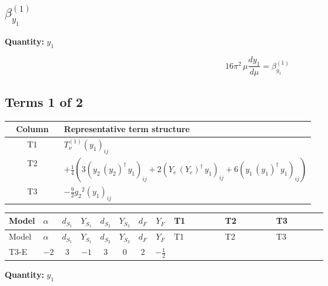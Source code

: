 \documentclass[8pt]{article}
\begin{document}
\begin{landscape}
\section*{$\beta_{y_1}^{(1)}$}
\noindent\textbf{Quantity: }$y_1$\par\smallskip
\[16\pi^2\,\mu\frac{d y_1}{d\mu}=\beta_{y_1}^{(1)}\]
\subsection*{Terms 1 of 2}
\begin{center}
\begin{tabular}{@{}c >{\raggedright\arraybackslash}p{0.82\linewidth}@{}}
\toprule
Column & Representative term structure \\
\midrule
T1 & \(\displaystyle T_{\nu}^{(1)} \left({y_1}\right)_{ij}\) \\
\midrule
T2 & \(\displaystyle +\frac{1}{4} (3 \left({y_2}\,\left({y_2}\right)^{\dagger}\,{y_1}\right)_{ij}+2 \left({Y_e}\,\left({Y_e}\right)^{\dagger}\,{y_1}\right)_{ij}+6 \left({y_1}\,\left({y_1}\right)^{\dagger}\,{y_1}\right)_{ij})\) \\
\midrule
T3 & \(\displaystyle -\frac{9}{2} {g_2}^2 \left({y_1}\right)_{ij}\) \\
\midrule
\bottomrule
\end{tabular}
\end{center}
\smallskip
\tiny
\begin{longtable}{@{}llcccccc >{\raggedright\arraybackslash}p{0.21\linewidth} >{\raggedright\arraybackslash}p{0.21\linewidth} >{\raggedright\arraybackslash}p{0.21\linewidth}@{}}
\toprule
Model & $\alpha$ & $d_{S_1}$ & $Y_{S_1}$ & $d_{S_2}$ & $Y_{S_2}$ & $d_F$ & $Y_F$ & T1 & T2 & T3 \\
\midrule
\endfirsthead
\toprule
Model & $\alpha$ & $d_{S_1}$ & $Y_{S_1}$ & $d_{S_2}$ & $Y_{S_2}$ & $d_F$ & $Y_F$ & T1 & T2 & T3 \\
\midrule
\endhead
T3-E & $-2$ & $3$ & $-1$ & $3$ & $0$ & $2$ & $-\frac{1}{2}$ & \scriptsize\adjustbox{max width=\linewidth}{$\begin{gathered} T_{\nu}^{(1)} \left({y_1}\right)_{ij}\end{gathered}$} & \scriptsize\adjustbox{max width=\linewidth}{$\begin{gathered} +\frac{1}{4} (3 \left({y_2}\,\left({y_2}\right)^{\dagger}\,{y_1}\right)_{ij}+2 \left({Y_e}\,\left({Y_e}\right)^{\dagger}\,{y_1}\right)_{ij}+6 \left({y_1}\,\left({y_1}\right)^{\dagger}\,{y_1}\right)_{ij})\end{gathered}$} & \scriptsize\adjustbox{max width=\linewidth}{$\begin{gathered} -\frac{9}{2} {g_2}^2 \left({y_1}\right)_{ij}\end{gathered}$} \\
\midrule
\bottomrule
\end{longtable}
\clearpage
\noindent\textbf{Quantity: }$y_1$\par\smallskip

\end{landscape}
\end{document}
